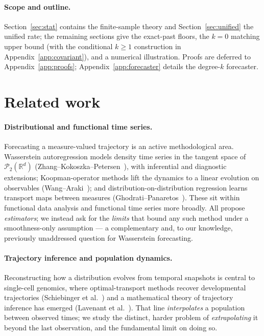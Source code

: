 \documentclass[11pt]{article}
\theoremstyle{definition}
\theoremstyle{remark}
\newcommand{\R}{\mathbb{R}}
\newcommand{\PP}{\mathcal{P}_2(\R^d)}
\begin{document}
\paragraph{Scope and outline.} Section~\ref{sec:stat} contains the finite-sample theory and
Section~\ref{sec:unified} the unified rate; the remaining sections give the exact-past floors, the
$k=0$ matching upper bound (with the conditional $k\ge1$ construction in
Appendix~\ref{app:covariant}), and a numerical illustration. Proofs are deferred to
Appendix~\ref{app:proofs}; Appendix~\ref{app:forecaster} details the degree-$k$ forecaster.

\section{Related work}

\paragraph{Distributional and functional time series.} Forecasting a measure-valued trajectory is
an active methodological area. Wasserstein autoregression models density time series in the
tangent space of $\PP$ (Zhang--Kokoszka--Petersen~\cite{war}), with inferential and diagnostic
extensions; Koopman-operator methods lift the dynamics to a linear evolution on observables
(Wang--Araki~\cite{kw}); and distribution-on-distribution regression learns transport maps between
measures (Ghodrati--Panaretos~\cite{gp}). These sit within functional data analysis and functional
time series more broadly. All propose \emph{estimators}; we instead ask for the \emph{limits} that
bound any such method under a smoothness-only assumption --- a complementary and, to our knowledge,
previously unaddressed question for Wasserstein forecasting.

\paragraph{Trajectory inference and population dynamics.} Reconstructing how a distribution evolves
from temporal snapshots is central to single-cell genomics, where optimal-transport methods recover
developmental trajectories (Schiebinger et al.~\cite{schiebinger}) and a mathematical theory of
trajectory inference has emerged (Lavenant et al.~\cite{lavenant}). That line \emph{interpolates} a
population between observed times; we study the distinct, harder problem of \emph{extrapolating} it
beyond the last observation, and the fundamental limit on doing so.
\end{document}
